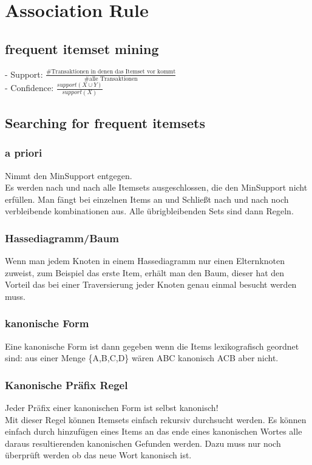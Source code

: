 \documentclass[a4paper]{scrartcl}
\begin{document}
\section{Association Rule}
\subsection{frequent itemset mining}
- Support: $\frac{\mbox{\#Transaktionen in denen das Itemset vor kommt}}{\mbox{\#alle Transaktionen}}$ \\
- Confidence: $\frac{support(X \cup Y)}{support(X)}$
\subsection{Searching for frequent itemsets}
\subsubsection{a priori}
Nimmt den MinSupport entgegen.\\
Es werden nach und nach alle Itemsets ausgeschlossen, die den MinSupport nicht erfüllen. Man fängt bei einzelnen Items an und Schließt nach und nach noch verbleibende kombinationen aus. Alle übrigbleibenden Sets sind dann Regeln.

\subsubsection{Hassediagramm/Baum}
Wenn man jedem Knoten in einem Hassediagramm nur einen Elternknoten zuweist, zum Beispiel das erste Item, erhält man den Baum, dieser hat den Vorteil das bei einer Traversierung jeder Knoten genau einmal besucht werden muss.
\subsubsection{kanonische Form}
Eine kanonische Form ist dann gegeben wenn die Items lexikografisch geordnet sind: aus einer Menge \{A,B,C,D\} wären ABC kanonisch ACB aber nicht.

\subsubsection{Kanonische Präfix Regel}
Jeder Präfix einer kanonischen Form ist selbst kanonisch!\\
Mit dieser Regel können Itemsets einfach rekursiv durchsucht werden. Es können einfach durch hinzufügen eines Items an das ende eines kanonischen Wortes alle daraus resultierenden kanonischen Gefunden werden. Dazu muss nur noch überprüft werden ob das neue Wort kanonisch ist.
\end{document}
